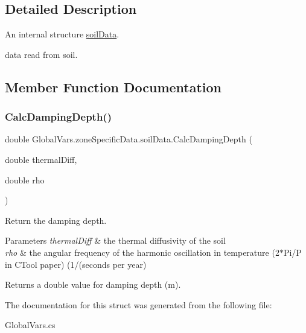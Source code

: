 \subsection{Detailed Description}
An internal structure \mbox{\hyperlink{struct_global_vars_1_1zone_specific_data_1_1soil_data}{soil\+Data}}. 

data read from soil. 

\subsection{Member Function Documentation}
\mbox{\label{struct_global_vars_1_1zone_specific_data_1_1soil_data_ac1e39d153db5d24b006172b9a44ee05a}} 
\subsubsection{\texorpdfstring{CalcDampingDepth()}{CalcDampingDepth()}}
{\footnotesize\ttfamily double Global\+Vars.\+zone\+Specific\+Data.\+soil\+Data.\+Calc\+Damping\+Depth (\begin{DoxyParamCaption}\item[{double}]{thermal\+Diff,  }\item[{double}]{rho }\end{DoxyParamCaption})\hspace{0.3cm}{\ttfamily [inline]}}



Return the damping depth. 


\begin{DoxyParams}{Parameters}
{\em thermal\+Diff} & the thermal diffusivity of the soil \\
\hline
{\em rho} & the angular frequency of the harmonic oscillation in temperature (2$\ast$\+Pi/P in C\+Tool paper) (1/(seconds per year)\\
\hline
\end{DoxyParams}
\begin{DoxyReturn}{Returns}
a double value for damping depth (m). 
\end{DoxyReturn}


The documentation for this struct was generated from the following file\+:\begin{DoxyCompactItemize}
\item 
Global\+Vars.\+cs\end{DoxyCompactItemize}
